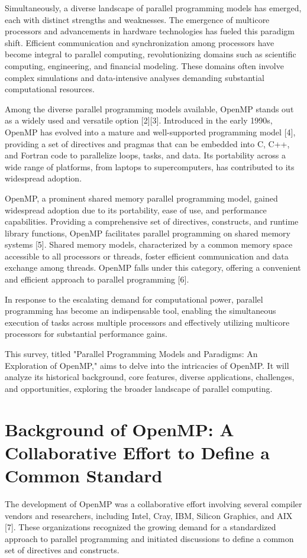 \documentclass[12pt,conference]{IEEEtran}
\begin{document}
Simultaneously, a diverse landscape of parallel programming models has emerged, each with distinct strengths and weaknesses. The emergence of multicore processors and advancements in hardware technologies has fueled this paradigm shift. Efficient communication and synchronization among processors have become integral to parallel computing, revolutionizing domains such as scientific computing, engineering, and financial modeling. These domains often involve complex simulations and data-intensive analyses demanding substantial computational resources.

Among the diverse parallel programming models available, OpenMP stands out as a widely used and versatile option [2][3]. Introduced in the early 1990s, OpenMP has evolved into a mature and well-supported programming model [4], providing a set of directives and pragmas that can be embedded into C, C++, and Fortran code to parallelize loops, tasks, and data. Its portability across a wide range of platforms, from laptops to supercomputers, has contributed to its widespread adoption.

OpenMP, a prominent shared memory parallel programming model, gained widespread adoption due to its portability, ease of use, and performance capabilities. Providing a comprehensive set of directives, constructs, and runtime library functions, OpenMP facilitates parallel programming on shared memory systems [5]. Shared memory models, characterized by a common memory space accessible to all processors or threads, foster efficient communication and data exchange among threads. OpenMP falls under this category, offering a convenient and efficient approach to parallel programming [6].

In response to the escalating demand for computational power, parallel programming has become an indispensable tool, enabling the simultaneous execution of tasks across multiple processors and effectively utilizing multicore processors for substantial performance gains.

This survey, titled "Parallel Programming Models and Paradigms: An Exploration of OpenMP," aims to delve into the intricacies of OpenMP. It will analyze its historical background, core features, diverse applications, challenges, and opportunities, exploring the broader landscape of parallel computing.

\section{Background of OpenMP: A Collaborative Effort to Define a Common Standard}
The development of OpenMP was a collaborative effort involving several compiler vendors and researchers, including Intel, Cray, IBM, Silicon Graphics, and AIX [7]. These organizations recognized the growing demand for a standardized approach to parallel programming and initiated discussions to define a common set of directives and constructs.
\end{document}
